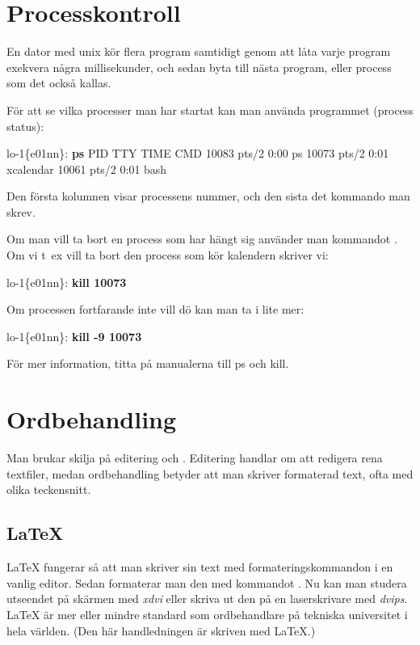 \documentclass[a4paper,twocolumn]{book}
\begin{document}
\section{Processkontroll}

En dator med unix kör flera program samtidigt genom
att låta varje program exekvera några millisekunder, och sedan byta
till nästa program, eller process som det också kallas.

För att se vilka processer man har startat kan man använda programmet
 (process status):
\begin{example}
lo-1\{e01nn\}: \textbf{ps}
   PID TTY      TIME CMD
 10083 pts/2    0:00 ps
 10073 pts/2    0:01 xcalendar
 10061 pts/2    0:01 bash
\end{example}
Den första kolumnen visar processens nummer, och den sista det
kommando man skrev.

Om man vill ta bort en process som har hängt sig använder man
kommandot . Om vi t~ex vill ta bort den process som kör
kalendern skriver vi:
\begin{example}
lo-1\{e01nn\}: \textbf{kill 10073}
\end{example}
Om processen fortfarande inte vill dö kan man ta i lite mer:
\begin{example}
lo-1\{e01nn\}: \textbf{kill -9 10073}
\end{example}
För mer information, titta på manualerna till ps och kill.

\section{Ordbehandling}

Man brukar skilja på editering och . Editering
handlar om att redigera rena textfiler, medan ordbehandling betyder
att man skriver formaterad text, ofta med olika teckensnitt.

\subsection{\LaTeX}

\LaTeX{} fungerar så
att man skriver sin text med formateringskommandon i en vanlig
editor. Sedan formaterar man den med kommandot . Nu
kan man studera utseendet på skärmen med \emph{xdvi} eller skriva ut
den på en laserskrivare med \emph{dvips}. \LaTeX{} är mer eller mindre
standard som ordbehandlare på tekniska universitet i hela världen.  (Den
här handledningen är skriven med \LaTeX.)
\end{document}
